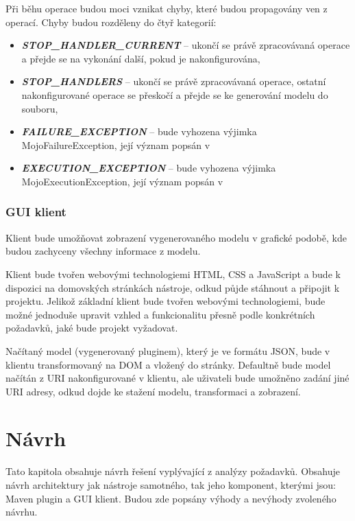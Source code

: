 \documentclass[11pt,twoside,a4paper]{book}
\begin{document}
Při běhu operace budou moci vznikat chyby, které budou propagovány ven z operací. Chyby
budou rozděleny do čtyř kategorií:

\begin{itemize}
  \item \textbf{\textit{STOP\_HANDLER\_CURRENT}} – ukončí se právě zpracovávaná operace a přejde
  se na vykonání další, pokud je nakonfigurována,
  \item \textbf{\textit{STOP\_HANDLERS}} – ukončí se právě
  zpracovávaná operace, ostatní nakonfigurované operace se přeskočí a přejde se ke generování modelu do souboru,
  \item \textbf{\textit{FAILURE\_EXCEPTION}} – bude
  vyhozena výjimka MojoFailureException, její význam popsán v  \cite{Maven08}
  \item \textbf{\textit{EXECUTION\_EXCEPTION}} – bude
  vyhozena výjimka MojoExecutionException, její význam popsán v  \cite{Maven08}
\end{itemize}

\subsection{GUI klient}

Klient bude umožňovat zobrazení vygenerovaného modelu v grafické podobě, kde budou
zachyceny všechny informace z modelu.

Klient bude tvořen webovými technologiemi HTML, CSS a JavaScript a bude k dispozici na
domovských stránkách nástroje, odkud půjde stáhnout a připojit k projektu. Jelikož základní
klient bude tvořen webovými technologiemi, bude možné jednoduše upravit vzhled a
funkcionalitu přesně podle konkrétních požadavků, jaké bude projekt vyžadovat.

Načítaný model (vygenerovaný pluginem), který je ve formátu JSON, bude v klientu
transformovaný na DOM a vložený do stránky. Defaultně bude model načítán z URI
nakonfigurované v klientu, ale uživateli bude umožněno zadání jiné URI adresy,
odkud dojde ke stažení modelu, transformaci a zobrazení.

\chapter{Návrh}

Tato kapitola obsahuje návrh řešení vyplývající z analýzy požadavků. Obsahuje
návrh architektury jak nástroje samotného, tak jeho komponent, kterými jsou: Maven plugin a GUI
klient. Budou zde popsány výhody a nevýhody zvoleného návrhu.
\end{document}
